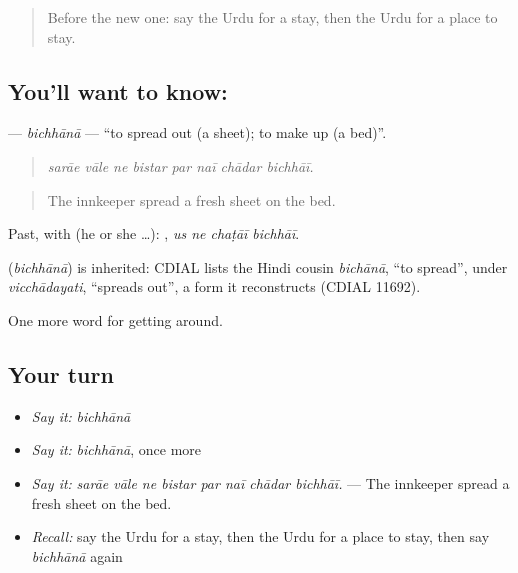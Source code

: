 \label{lesson:UR-C403-bichhana}



\begin{quote}
Before the new one: say the Urdu for a stay, then the Urdu for a place to stay.
\end{quote}

\subsection*{You'll want to know: }
\textbf{} — \emph{bichhānā} — \textquotedblleft{}to spread out (a sheet); to make up (a bed)\textquotedblright{}.

\begin{quote}
       
\end{quote}

\begin{quote}
\emph{sarāe vāle ne bistar par naī chādar bichhāī.}
\end{quote}

\begin{quote}
The innkeeper spread a fresh sheet on the bed.
\end{quote}

Past, with  (he or she …):    , \emph{us ne chaṭāī bichhāī}.

\begin{cousinweb}
\textbf{} (\emph{bichhānā}) is inherited: CDIAL lists the Hindi cousin \emph{bichānā}, \textquotedblleft{}to spread\textquotedblright{}, under \emph{vicchādayati}, \textquotedblleft{}spreads out\textquotedblright{}, a form it reconstructs (CDIAL 11692).
\end{cousinweb}

\begin{grammarlens}[title={What you've built}]
One more word for getting around.
\end{grammarlens}

\subsection*{Your turn}
\begin{itemize}
\raggedright
  \item \emph{Say it:} \emph{bichhānā}
  \item \emph{Say it:} \emph{bichhānā}, once more
  \item \emph{Say it:} \emph{sarāe vāle ne bistar par naī chādar bichhāī.} — The innkeeper spread a fresh sheet on the bed.
  \item \emph{Recall:} say the Urdu for a stay, then the Urdu for a place to stay, then say \emph{bichhānā} again
\end{itemize}

